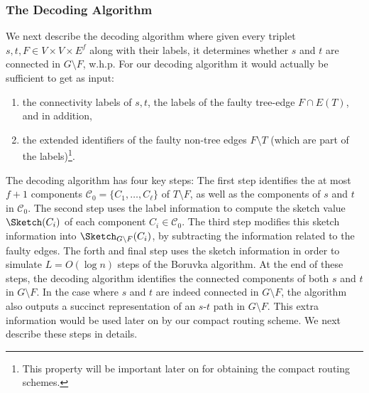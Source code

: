 \subsubsection{The Decoding Algorithm} \label{sec:dec-alg}
We next describe the decoding algorithm where given every triplet $s,t, F \in V \times V \times E^f$ along with their labels, it determines whether $s$ and $t$ are connected in $G\setminus F$, w.h.p. For our decoding algorithm it would actually be sufficient to get as input:
\begin{enumerate}[noitemsep]
\item the connectivity labels of $s,t$, the labels of the faulty tree-edge $F \cap E(T)$, and in addition,
\item the extended identifiers of the faulty non-tree edges $F \setminus T$ (which are part of the labels)\footnote{This property will be important later on for obtaining the compact routing schemes.}. 
\end{enumerate}
The decoding algorithm has four key steps: The first step identifies the at most $f+1$ components $\mathcal{C}_0=\{C_1,\ldots, C_\ell\}$ of $T \setminus F$, as well as the components of $s$ and $t$ in $\mathcal{C}_0$. The second step uses the label information to compute the sketch value $\Sketch(C_i)$ of each component $C_i \in \mathcal{C}_0$. The third step modifies this sketch information into $\Sketch_{G \setminus F}(C_i)$, by subtracting the information related to the faulty edges. The forth and final step uses the sketch information in order to simulate $L=O(\log n)$ steps of the Boruvka algorithm. At the end of these steps, the decoding algorithm identifies the connected components of both $s$ and $t$ in $G \setminus F$. In the case where $s$ and $t$ are indeed connected in $G \setminus F$, the algorithm also outputs a succinct representation of an $s$-$t$ path in $G \setminus F$. This extra information would be used later on by our compact routing scheme. We next describe these steps in details. 

